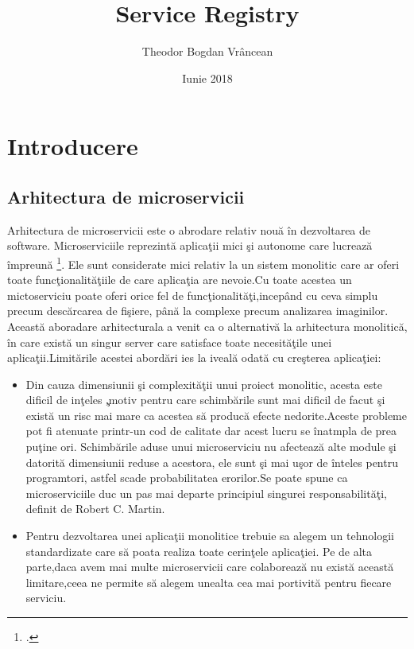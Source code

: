\documentclass[a4paper,12pt]{report}
\title{Service Registry}
\author{Theodor Bogdan Vr\^ancean}
\date {Iunie 2018}
\begin{document}
\maketitle 
\chapter{Introducere} 
\section{Arhitectura de microservicii}

Arhitectura de microservicii este o abrodare relativ nou\u a \^ in dezvoltarea de software.
Microserviciile reprezint\u a aplica\c tii mici \c si autonome care lucreaz\u a \^ impreun\u a 
\footcite{buildingMicroservices}. Ele sunt considerate mici relativ la un sistem monolitic care ar
oferi toate func\c tionalit\u a\c tiile de care aplica\c tia are nevoie.Cu toate acestea un mictoserviciu poate oferi orice
fel de func\c tionalit\u a\c ti,incep\^and cu ceva simplu precum desc\u arcarea de fi\c siere, p\^an\u a la 
 complexe precum analizarea imaginilor.
 Aceast\u a aboradare arhitecturala a venit ca o alternativ\u a la arhitectura monolitic\u a, \^in care exist\u a 
 un singur server care satisface toate necesit\u a\c tile unei aplica\c tii.Limit\u arile acestei abord\u ari ies la iveal\u a
 odat\u a cu cre\c sterea aplica\c tiei:
 \begin{itemize}
     \item Din cauza dimensiunii \c si complexit\u a\c tii unui proiect monolitic,
    acesta este dificil de in\c teles \c ,motiv pentru care schimb\u arile sunt mai dificil de facut \c si exist\u a 
    un risc mai mare ca acestea s\u a produc\u a efecte nedorite.Aceste probleme pot fi atenuate printr-un 
    cod de calitate dar acest lucru se \^ inatmpla de prea pu\c tine ori. Schimb\u arile aduse unui microserviciu nu afecteaz\u a alte
    module \c si datorit\u a dimensiunii reduse a acestora, ele sunt \c si mai u\c sor de \^inteles pentru programtori, astfel 
    scade probabilitatea erorilor.Se poate spune ca microserviciile duc un pas mai departe principiul singurei responsabilit\u a\c ti,
    definit de Robert C. Martin.
    \item Pentru dezvoltarea unei aplica\c tii monolitice trebuie sa alegem un tehnologii standardizate care s\u a poata 
    realiza toate cerin\c tele aplica\c tiei. Pe de alta parte,daca avem mai multe microservicii care colaboreaz\u a nu exist\u a aceast\u a limitare,ceea ne permite s\u a alegem 
    unealta cea mai portivit\u a pentru fiecare serviciu.


    

\end{itemize}
\end{document}
